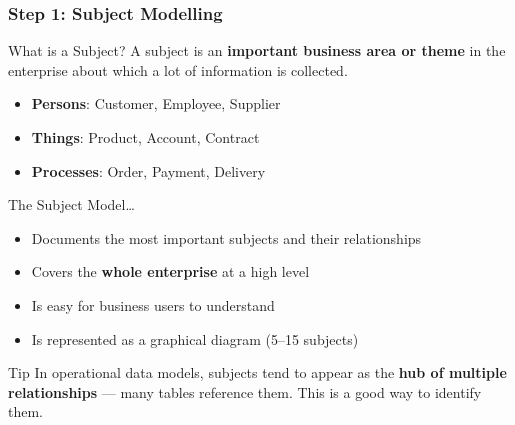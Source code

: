\begin{frame}
  \frametitle{Step 1: Subject Modelling}

  \begin{block}{What is a Subject?}
    A subject is an \textbf{important business area or theme} in the enterprise
    about which a lot of information is collected.
    \begin{itemize}
      \item \textbf{Persons}: Customer, Employee, Supplier
      \item \textbf{Things}: Product, Account, Contract
      \item \textbf{Processes}: Order, Payment, Delivery
    \end{itemize}
  \end{block}

  \begin{block}{The Subject Model\ldots}
    \begin{itemize}
      \item Documents the most important subjects and their relationships
      \item Covers the \textbf{whole enterprise} at a high level
      \item Is easy for business users to understand
      \item Is represented as a graphical diagram (5--15 subjects)
    \end{itemize}
  \end{block}

  \begin{examples}{Tip}
    In operational data models, subjects tend to appear as the \textbf{hub
    of multiple relationships} --- many tables reference them.
    This is a good way to identify them.
  \end{examples}
\end{frame}

